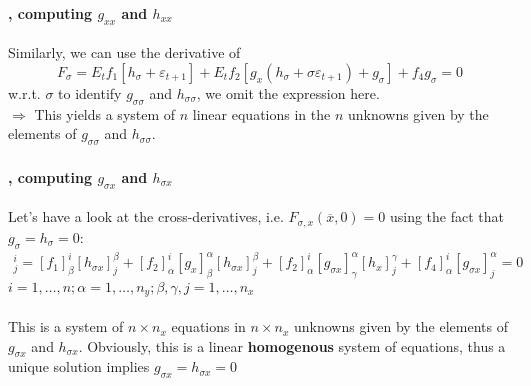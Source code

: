 \documentclass[handout]{beamer}  %
\begin{document}
\begin{frame}
  \frametitle{\secname}\framesubtitle{\subsecname, computing $g_{xx}$ and $h_{xx}$}
Similarly, we can use the derivative of $$F_\sigma = E_t f_1[h_\sigma + \varepsilon_{t+1}] + E_t f_2 [g_x(h_\sigma+\sigma \varepsilon_{t+1})+g_\sigma] + f_4 g_\sigma = 0$$ w.r.t. $\sigma$ to identify $g_{\sigma\sigma}$ and $h_{\sigma\sigma}$, we omit the expression here.\\ $\Rightarrow$ This yields a system of $n$ linear equations in the $n$ unknowns given by the elements of $g_{\sigma\sigma}$ and $h_{\sigma\sigma}$.
\end{frame}

\begin{frame}
\frametitle{\secname}\framesubtitle{\subsecname, computing $g_{\sigma x}$ and $h_{\sigma x}$}
Let's have a look at the cross-derivatives, i.e. $F_{\sigma,x}(\overline{x},0)=0$ using the fact that $g_\sigma=h_\sigma=0$:
\begin{align*}
  [F_{\sigma_x}]^i_j = [f_1]^i_\beta[h_{\sigma x}]_j^\beta + [f_{2}]_\alpha^i[g_x]_\beta^\alpha[h_{\sigma x}]_j^\beta + [f_2]_\alpha^i [g_{\sigma x}]_\gamma^\alpha [h_x]_j^\gamma + [f_4]_\alpha^i[g_{\sigma x}]_j^\alpha = 0
\end{align*}
$i=1,\dots, n; \alpha=1,\dots, n_y; \beta,\gamma,j=1,\dots,n_x$\\~\\
This is a system of $n\times n_x$ equations in $n\times n_x$ unknowns given by the elements of $g_{\sigma x}$ and $h_{\sigma x}$. Obviously, this is a linear \textbf{homogenous} system of equations, thus a unique solution implies $g_{\sigma x}=h_{\sigma x}=0$
\end{frame}
\end{document}
